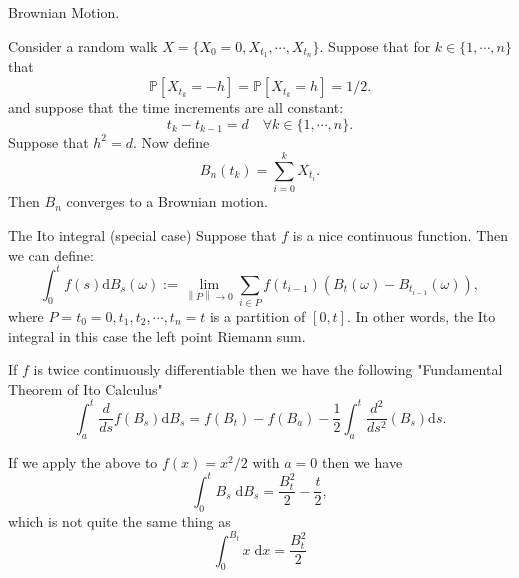 \documentclass{beamer}%
\numberwithin{equation}{section}
\newcommand{\Norm}[1]{\left\|  #1   \right\|}
\newcommand{\ud}{\ensuremath{\mathrm{d} }}
\begin{document}
\begin{frame}{Brownian Motion.}
	
	\begin{Theorem}
		Consider a random walk $X = \{X_{0}=0, X_{t_1}, \cdots, X_{t_n}\}$. Suppose that for $k \in \{1, \cdots ,n\}$ that
		\[
		\mathbb{P}\left[ X_{t_k} = -h \right] = \mathbb{P}\left[ X_{t_k} = h \right] = 1/2.
		\]
		and suppose that the time increments are all constant:
		\[
		t_k-t_{k-1} = d \quad \forall k \in \{ 1, \cdots, n \}.
		\]
		Suppose that $h^2 = d$. Now define 
		\[
		B_n(t_{k}) = \sum_{i=0}^k X_{t_i}.
		\]
		Then $B_n$ converges to a Brownian motion. 
	\end{Theorem}
\end{frame}

\begin{frame}{The Ito integral (special case)}
	Suppose that $f$ is a nice continuous function. Then we can define:
		\[
			\int_0^t f(s) \ud B_s(\omega) := \lim_{\Norm{P} \to 0} \sum _{i \in P} f(t_{i-1}) (B_t(\omega) - B_{t_{i-1}}(\omega)),
		\]
	where $P = {t_0 = 0, t_1, t_2, \cdots, t_n = t}$ is a partition of $[0,t]$. In other words, the Ito integral in this case the left point Riemann sum. 
	
	\vspace{.1in}
	
		\begin{theorem}
		If $f$ is twice continuously differentiable then we have the following "Fundamental Theorem of Ito Calculus"
		\[
		\int_a^t \frac{d}{ds} f(B_s) \ud B_s = f(B_t) - f(B_a) - \frac{1}{2} \int_a^t \frac{d^2}{ds^2}(B_s) \ud s.
		\]
	\end{theorem}
	
\end{frame}


\begin{frame}[t]

\begin{example}
If we apply the above to $f(x) = x^2 / 2$ with $a=0$ then we have 
	\[
		\int_0^t B_s \; \ud B_s = \frac{B_t^2}{2}  - \frac{t}{2},
	\]
which is not quite the same thing as 
	\[
		\int_0^{B_t} x \; \ud x = \frac{B_t^2}{2} 
	\]
\end{example}
\end{frame}
\end{document}
